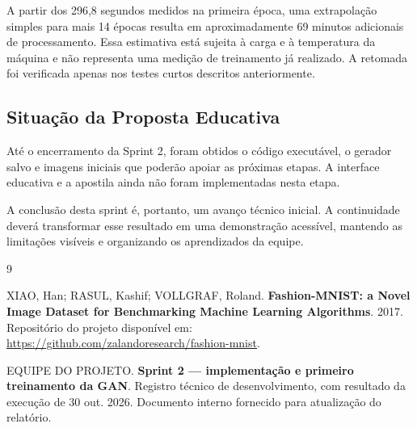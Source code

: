 \documentclass[12pt,a4paper]{article}
\begin{document}
A partir dos 296,8 segundos medidos na primeira época, uma extrapolação simples para mais 14 épocas resulta em aproximadamente 69 minutos adicionais de processamento. Essa estimativa está sujeita à carga e à temperatura da máquina e não representa uma medição de treinamento já realizado. A retomada foi verificada apenas nos testes curtos descritos anteriormente.

\subsection{Situação da Proposta Educativa}
Até o encerramento da Sprint 2, foram obtidos o código executável, o gerador salvo e imagens iniciais que poderão apoiar as próximas etapas. A interface educativa e a apostila ainda não foram implementadas nesta etapa.

A conclusão desta sprint é, portanto, um avanço técnico inicial. A continuidade deverá transformar esse resultado em uma demonstração acessível, mantendo as limitações visíveis e organizando os aprendizados da equipe.

\begin{thebibliography}{9}

XIAO, Han; RASUL, Kashif; VOLLGRAF, Roland.
\textbf{Fashion-MNIST: a Novel Image Dataset for Benchmarking Machine Learning Algorithms}.
2017. Repositório do projeto disponível em:
\url{https://github.com/zalandoresearch/fashion-mnist}.

EQUIPE DO PROJETO.
\textbf{Sprint 2 --- implementação e primeiro treinamento da GAN}.
Registro técnico de desenvolvimento, com resultado da execução de 30 out. 2026.
Documento interno fornecido para atualização do relatório.
\end{thebibliography}
\end{document}
